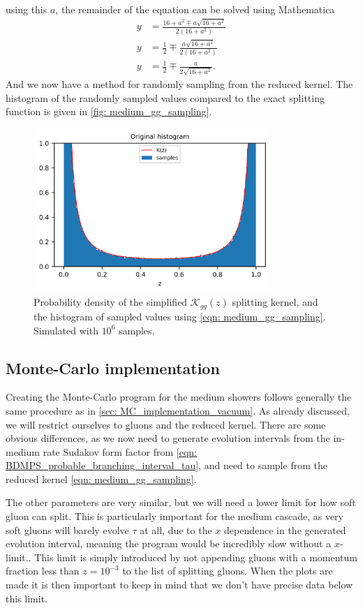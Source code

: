 \documentclass[main.tex]{subfiles}
\begin{document}
using this \(a\), the remainder of the equation can be solved using Mathematica
\begin{align}\label{eqn: medium_gg_sampling}
    y &= \frac{16 + a^2 \mp a \sqrt{16 + a^2}}{2 (16 + a^2)} \nonumber\\
    y &= \frac{1}{2} \mp \frac{a \sqrt{16 + a^2}}{2 (16 + a^2)} \nonumber\\
    y &= \frac{1}{2} \mp \frac{a }{2 \sqrt{16 + a^2}}.
\end{align}
And we now have a method for randomly sampling from the reduced kernel. The histogram of the randomly sampled values compared to the exact splitting function is given in \autoref{fig: medium_gg_sampling}. 
\begin{figure}[htb]
    \centering
    \includegraphics[width=9cm]{pictures/plots/splitting_functions/medium_gg_samples.png}
    \caption{Probability density of the simplified \(\mathcal{K}_{gg}(z)\) splitting kernel, and the histogram of sampled values using \autoref{eqn: medium_gg_sampling}. Simulated with \(10^6\) samples.}
    \label{fig: medium_gg_sampling}
\end{figure}

\subsection{Monte-Carlo implementation}
Creating the Monte-Carlo program for the medium showers follows generally the same procedure as in \autoref{sec: MC_implementation_vacuum}. As already discussed, we will restrict ourselves to gluons and the reduced kernel. There are some obvious differences, as we now need to generate evolution intervals from the in-medium rate Sudakov form factor from \autoref{eqn: BDMPS_probable_branching_interval_tau}, and need to sample from the reduced kernel \autoref{eqn: medium_gg_sampling}. 

The other parameters are very similar, but we will need a lower limit for how soft gluon can split. This is particularly important for the medium cascade, as very soft gluons will barely evolve \(\tau\) at all, due to the \(x\) dependence in the generated evolution interval, meaning the program would be incredibly slow without a \(x\)-limit.. This limit is simply introduced by not appending gluons with a momentum fraction less than \(z=10^{-3}\) to the list of splitting gluons. When the plots are made it is then important to keep in mind that we don't have precise data below this limit. 
\end{document}
